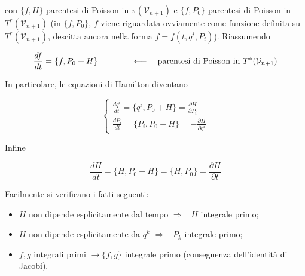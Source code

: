 
con $ \{ f, H \} $ parentesi di Poisson in $ \pi(\mathcal{V}_{n + 1}) $ e $ \{ f, P_0 \} $ parentesi di Poisson in $ T^* (\mathcal{V}_{n+1}) $ (in $ \{ f, P_0 \} $, $ f $ viene riguardata ovviamente come funzione definita su $ T^* (\mathcal{V}_{n+1}) $, descitta ancora nella forma $ f = f (t, q^i, P_i) $). Riassumendo

\begin{equation*} \label{pag:trasf_leg_geom}
\frac{df}{dt} = \{ f, P_0 + H \} \qquad \qquad \longleftarrow \quad \text{parentesi di Poisson in $ T^* (\mathcal{V}_{n+1}) $}
\end{equation*}

In particolare, le equazioni di Hamilton diventano

\begin{equation*}
\begin{cases}
\frac{dq^i}{dt} = \{q^i, P_0 + H\} = \frac{\partial H}{\partial P_i} \\
\frac{dP_i}{dt} = \{P_i, P_0 + H\} = - \frac{\partial H}{\partial q^i}
\end{cases}
\end{equation*}

Infine

\begin{equation*}
\frac{dH}{dt} = \{H, P_0 + H\} = \{H, P_0\} = \frac{\partial H}{\partial t}
\end{equation*}

Facilmente si verificano i fatti seguenti:

\begin{itemize}
\item $ H $ non dipende esplicitamente dal tempo $ \Longrightarrow $ \, $ H $ integrale primo;
\item $ H $ non dipende esplicitamente da $ q^k $ $ \Longrightarrow $ \, $ P_k $ integrale primo;
\item $ f, g $ integrali primi $ \longrightarrow \{f, g\} $  integrale primo (conseguenza dell'identità di Jacobi).
\end{itemize}